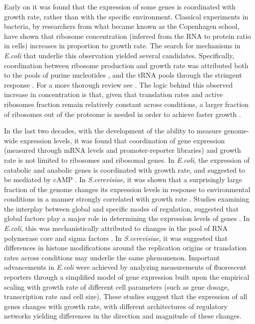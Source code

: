 \documentclass[notitlepage]{article}
\begin{document}
Early on it was found that the expression of some genes is coordinated with growth rate, rather than with the specific environment.
Classical experiments in bacteria, by researchers from what became known as the Copenhagen school, have shown that ribosome concentration (inferred from the RNA to protein ratio in cells) increases in proportion to growth rate\cite{Schaechter1958}.
The search for mechanisms in \emph{E.coli} that underlie this observation yielded several candidates.
Specifically, coordination between ribosome production and growth rate was attributed both to the pools of purine nucleotides \cite{Gourse1996,Gaal1997}, and the tRNA pools through the stringent response \cite{Chatterji2001,Brauer2008a}.
For a more thorough review see \cite{Nomura1984}.
The logic behind this observed increase in concentration is that, given that translation rates and active ribosomes fraction remain relatively constant across conditions, a larger fraction of ribosomes out of the proteome is needed in order to achieve faster growth \cite{neidhardt1999a,dennis2004,Zaslaver2009}.

In the last two decades, with the development of the ability to measure genome-wide expression levels, it was found that coordination of gene expression (measured through mRNA levels and promoter-reporter libraries) and growth rate is not limited to ribosomes and ribosomal genes.
In \emph{E.coli}, the expression of catabolic and anabolic genes is coordinated with growth rate, and suggested to be mediated by cAMP \cite{Saldanha2004}.
In \emph{S.cerevisiae}, it was shown that a surprisingly large fraction of the genome changes its expression levels in response to environmental conditions in a manner strongly correlated with growth rate \cite{Keren2013a,Gasch2000,Castrillo2007,Zaslaver2009, Gerosa2013}.
Studies examining the interplay between global and specific modes of regulation, suggested that global factors play a major role in determining the expression levels of genes \cite{Gasch2000, Klumpp2009a,Scott2010, Berthoumieux2013}.
In \emph{E.coli}, this was mechanistically attributed to changes in the pool of RNA polymerase core and sigma factors \cite{Klumpp2008}.
In \emph{S.cerevisiae}, it was suggested that differences in histone modifications around the replication origins \cite{regenberg2006} or translation rates \cite{Gasch2000} across conditions may underlie the same phenomenon.
Important advancements in \emph{E.coli} were achieved by analyzing measurements of fluorescent reporters through a simplified model of gene expression built upon the empirical scaling with growth rate of different cell parameters (such as gene dosage, transcription rate and cell size)\cite{Klumpp2009a}.
These studies suggest that the expression of all genes changes with growth rate, with different architectures of regulatory networks yielding differences in the direction and magnitude of these changes. 
\end{document}
